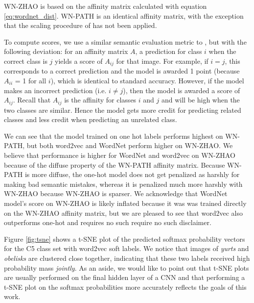 WN-ZHAO is based on the affinity matrix calculated with equation
\ref{eq:wordnet_dist}. WN-PATH is an identical affinity matrix, with the
exception that the scaling procedure of \cite{zhao2011large} has not been
applied.

To compute scores, we use a similar semantic evaluation metric to
\cite{zhao2011large}, but with the following deviation: for an affinity matrix
$A$, a prediction for class $i$ when the correct class is $j$ yields a score of
$A_{ij}$ for that image. For example, if $i = j$, this corresponds to a correct
prediction and the model is awarded 1 point (because $A_{ii}$ = 1 for all $i$),
which is identical to standard accuracy. However, if the model makes an
incorrect prediction (i.e. $i \neq j$), then the model is awarded a score of
$A_{ij}$.  Recall that $A_{ij}$ is the affinity for classes $i$ and $j$ and will
be high when the two classes are similar. Hence the model gets more credit for
predicting related classes and less credit when predicting an unrelated class.

We can see that the model trained on one hot labels performs highest on WN-PATH,
but both word2vec and WordNet perform higher on WN-ZHAO. We believe that
performance is higher for WordNet and word2vec on WN-ZHAO because of the diffuse
property of the WN-PATH affinity matrix. Because WN-PATH is more diffuse, the
one-hot model does not get penalized as harshly for making bad semantic
mistakes, whereas it is penalized much more harshly with WN-ZHAO because WN-ZHAO
is sparser.  We acknowledge that WordNet model's score on WN-ZHAO is likely
inflated because it was was trained directly on the WN-ZHAO affinity matrix, but
we are pleased to see that word2vec also outperforms one-hot and requires no
such require no such disclaimer.

Figure \ref{fig:tsne} shows a t-SNE plot of the predicted softmax probability
vectors for the C5 class set with word2vec soft labels. We notice that images of
\emph{yurts} and \emph{obelisks} are clustered close together, indicating that
these two labels received high probability mass \emph{jointly}. As an aside, we
would like to point out that t-SNE plots are usually performed on the final
hidden layer of a CNN and that performing a t-SNE plot on the softmax
probabilities more accurately reflects the goals of this work.

